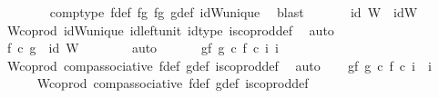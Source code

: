 \begin{isabellebody}
\ \ \ \ \ \ \isamarkupfalse%
\ comp{\isacharunderscore}{\kern0pt}type\ f{\isacharunderscore}{\kern0pt}def\ fg{}\ fg{}\ g{\isacharunderscore}{\kern0pt}def\ idW{\isacharunderscore}{\kern0pt}unique\ \isamarkupfalse%
\ blast\isanewline
\ \ \ \ \isamarkupfalse%
\ {}{\isacharcolon}{\kern0pt}\ {\isachardoublequoteopen}id\ W\ {\isacharequal}{\kern0pt}\ idW{\isachardoublequoteclose}\isanewline
\ \ \ \ \ \ \isamarkupfalse%
\ W{\isacharunderscore}{\kern0pt}coprod\ idW{\isacharunderscore}{\kern0pt}unique\ id{\isacharunderscore}{\kern0pt}left{\isacharunderscore}{\kern0pt}unit{}\ id{\isacharunderscore}{\kern0pt}type\ is{\isacharunderscore}{\kern0pt}coprod{\isacharunderscore}{\kern0pt}def\ \isamarkupfalse%
\ auto\isanewline
\ \ \ \ \isamarkupfalse%
\ {}\ {}\ \isamarkupfalse%
\ {\isachardoublequoteopen}f\ {\isasymcirc}\isactrlsub c\ g\ {\isacharequal}{\kern0pt}\ id\ W{\isachardoublequoteclose}\isanewline
\ \ \ \ \ \ \isamarkupfalse%
\ auto\isanewline
\ \ \isamarkupfalse%
\isanewline
\isanewline
\ \ \isamarkupfalse%
\ gf{}{\isacharcolon}{\kern0pt}\ {\isachardoublequoteopen}{\isacharparenleft}{\kern0pt}g\ {\isasymcirc}\isactrlsub c\ f{\isacharparenright}{\kern0pt}\ {\isasymcirc}\isactrlsub c\ i{\isacharprime}{\kern0pt}\ i{\isacharprime}{\kern0pt}\isanewline
\ \ \ \ \isamarkupfalse%
\ W{\isacharprime}{\kern0pt}{\isacharunderscore}{\kern0pt}coprod\ comp{\isacharunderscore}{\kern0pt}associative{}\ f{\isacharunderscore}{\kern0pt}def\ g{\isacharunderscore}{\kern0pt}def\ is{\isacharunderscore}{\kern0pt}coprod{\isacharunderscore}{\kern0pt}def\ \isamarkupfalse%
\ auto\isanewline
\ \ \isamarkupfalse%
\ gf{}{\isacharcolon}{\kern0pt}\ {\isachardoublequoteopen}{\isacharparenleft}{\kern0pt}g\ {\isasymcirc}\isactrlsub c\ f{\isacharparenright}{\kern0pt}\ {\isasymcirc}\isactrlsub c\ i{\isacharprime}{\kern0pt}\ {\isacharequal}{\kern0pt}\ i{\isacharprime}{\kern0pt}\isanewline
\ \ \ \ \isamarkupfalse%
\ W{\isacharprime}{\kern0pt}{\isacharunderscore}{\kern0pt}coprod\ comp{\isacharunderscore}{\kern0pt}associative{}\ f{\isacharunderscore}{\kern0pt}def\ g{\isacharunderscore}{\kern0pt}def\ is{\isacharunderscore}{\kern0pt}coprod{\isacharunderscore}{\kern0pt}def\ \isamarkupfalse%

\end{isabellebody}
